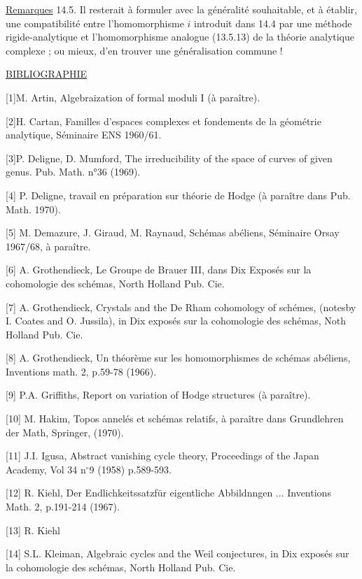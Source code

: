 \underline{Remarques} 14.5. Il resterait à formuler avec la généralité souhaitable, et à établir, une compatibilité entre l'homomorphisme $i$ introduit dans 14.4 par une méthode rigide-analytique et l'homomorphisme analogue (13.5.13) de la théorie analytique complexe ; ou mieux, d'en trouver une généralisation commune !


\underline{BIBLIOGRAPHIE}

[1]\quad M. Artin, Algebraization of formal moduli I (à paraître).

[2]\quad H. Cartan, Familles d'espaces complexes et fondements de la géométrie analytique, Séminaire ENS 1960/61.

[3]\quad P. Deligne, D. Mumford, The irreducibility of the space of curves of given genus. Pub. Math. n°36 (1969).



{[}4] P. Deligne, travail en préparation sur théorie de Hodge (à paraître dans Pub. Math. 1970).

{[}5] M. Demazure, J. Giraud, M. Raynaud, Schémas abéliens, Séminaire Orsay 1967/68, à paraître.

{[}6] A. Grothendieck, Le Groupe de Brauer III, dans Dix Exposés sur la cohomologie des schémas, North Holland Pub. Cie.

{[}7] A. Grothendieck, Crystals and the De Rham cohomology of schémes, (notesby I. Coates and O. Jussila), in Dix exposés sur la cohomologie des schémas, Noth Holland Pub. Cie.

{[}8] A. Grothendieck, Un théorème sur les homomorphismes de schémas abéliens, Inventions math. 2, p.59-78 (1966).

{[}9] P.A. Griffiths, Report on variation of Hodge structures (à paraître).

{[}10] M. Hakim, Topos annelés et schémas relatifs, à paraître dans Grundlehren der Math, Springer, (1970).

{[}11] J.I. Igusa, Abstract vanishing cycle theory, Proceedings of the Japan Academy, Vol 34 n$^\circ$9 (1958) p.589-593.

{[}12] R. Kiehl, Der Endlichkeitssatzfür eigentliche Abbildnngen ... Inventions Math. 2, p.191-214 (1967).

{[}13] R. Kiehl



{[}14] S.L. Kleiman, Algebraic cycles and the Weil conjectures, in Dix exposés sur la cohomologie des schémas, North Holland Pub. Cie.

